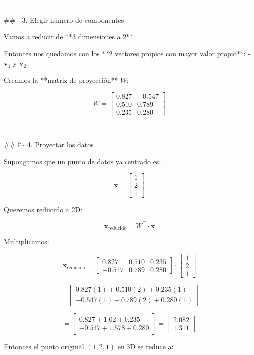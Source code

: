 \documentclass[12pt]{article} %
\begin{document}
---

## 🧭 3. Elegir número de componentes

Vamos a reducir de **3 dimensiones a 2**.

Entonces nos quedamos con los **2 vectores propios con mayor valor propio**:
- \( \mathbf{v}_1 \) y \( \mathbf{v}_2 \)

Creamos la **matriz de proyección** \( W \):

\[
W = 
\begin{bmatrix}
0.827 & -0.547 \\
0.510 & 0.789 \\
0.235 & 0.280
\end{bmatrix}
\]

---

## 📉 4. Proyectar los datos

Supongamos que un punto de datos ya centrado es:

\[
\mathbf{x} = \begin{bmatrix} 1 \\ 2 \\ 1 \end{bmatrix}
\]

Queremos reducirlo a 2D:

\[
\mathbf{x}_{\text{reducido}} = W^\top \cdot \mathbf{x}
\]

Multiplicamos:

\[
\mathbf{x}_{\text{reducido}} =
\begin{bmatrix}
0.827 & 0.510 & 0.235 \\
-0.547 & 0.789 & 0.280
\end{bmatrix}
\cdot
\begin{bmatrix}
1 \\ 2 \\ 1
\end{bmatrix}
\]

\[
=
\begin{bmatrix}
0.827(1) + 0.510(2) + 0.235(1) \\
-0.547(1) + 0.789(2) + 0.280(1)
\end{bmatrix}
\]

\[
=
\begin{bmatrix}
0.827 + 1.02 + 0.235 \\
-0.547 + 1.578 + 0.280
\end{bmatrix}
=
\begin{bmatrix}
2.082 \\
1.311
\end{bmatrix}
\]

Entonces el punto original \( (1, 2, 1) \) en 3D se reduce a:
\end{document}
